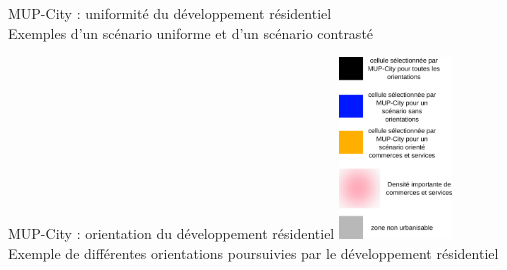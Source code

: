 \documentclass[xcolor=table]{beamer}
\begin{document}

\begin{frame}{MUP-City : uniformité du développement résidentiel}
	\vspace{1cm}
	\\
	{\footnotesize Exemples d'un scénario uniforme et d'un scénario contrasté}
\end{frame}


\begin{frame}{MUP-City : orientation du développement résidentiel}
	\vspace{1cm}
	\hspace*{-0.5cm}
	\includegraphics[width=3cm]{Images/legendAHP.png}
	\\
	{\footnotesize Exemple de différentes orientations poursuivies par le développement résidentiel}
\end{frame}
\end{document}
